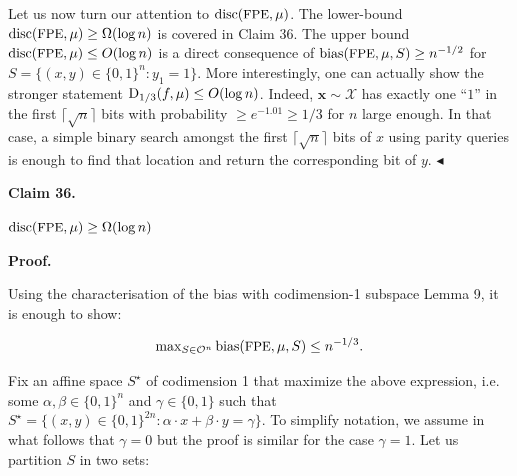Let us now turn our attention to ${\textup{disc}}({\textrm{\small{FPE}}},\mu)$.
The lower-bound ${\textup{disc}}({\textrm{\small{FPE}}},\mu)\geq\Omega(\log n)$ is covered in Claim 36. The upper bound ${\textup{disc}}({\textrm{\small{FPE}}},\mu)\leq O(\log n)$ is a direct consequence of ${\textup{bias}}({\textrm{\small{FPE}}},\mu,S)\geq n^{-1/2}$ for $S=\{(x,y)\in\{0,1\}^{n}:y_{1}=1\}$. More interestingly, one can actually show the stronger statement ${\textup{D}}_{1/3}(f,\mu)\leq O(\log n)$. Indeed, $\bm{x}\sim\mathcal{X}$ has exactly one “$1$” in the first $\lceil\sqrt{n}\rceil$ bits with probability $\geq e^{-1.01}\geq 1/3$ for $n$ large enough. In that case, a simple binary search amongst the first $\lceil\sqrt{n}\rceil$ bits of $x$ using parity queries is enough to find that location and return the corresponding bit of $y$.
$\blacktriangleleft$\par





\par\medskip\noindent\textbf{
Claim 36. 
}\par



${\textup{disc}}(\textup{{{\small{FPE}}}},\mu)\geq\Omega(\log n)$\par







\par\medskip\noindent\textbf{
\textbf{Proof}.}\par




Using the characterisation of the bias with codimension-1 subspace Lemma 9, it is enough to show:\par


\[\begin{gathered}
\max\nolimits_{S\in\mathcal{O}^{n}}{\textup{bias}}({\textrm{\small{FPE}}},\mu,S)\leq n^{-1/3}.
\end{gathered}\]


Fix an affine space $S^{\star}$ of codimension 1 that maximize the above expression, i.e. some $\alpha,\beta\in\{0,1\}^{n}$ and $\gamma\in\{0,1\}$ such that $S^{\star}=\{(x,y)\in\{0,1\}^{2n}:\alpha\cdot x+\beta\cdot y=\gamma\}$. To simplify notation, we assume in what follows that $\gamma=0$ but the proof is similar for the case $\gamma=1$. Let us partition $S$ in two sets:\par



